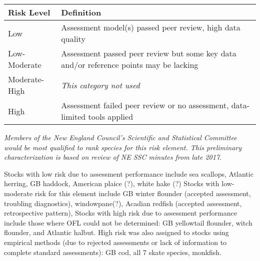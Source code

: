 \documentclass[11pt,]{article}
\begin{document}
\begin{longtable}[]{@{}ll@{}}
\toprule
\begin{minipage}[b]{0.22\columnwidth}\raggedright\strut
Risk Level\strut
\end{minipage} & \begin{minipage}[b]{0.72\columnwidth}\raggedright\strut
Definition\strut
\end{minipage}\tabularnewline
\midrule
\endhead
\begin{minipage}[t]{0.22\columnwidth}\raggedright\strut
Low\strut
\end{minipage} & \begin{minipage}[t]{0.72\columnwidth}\raggedright\strut
Assessment model(s) passed peer review, high data quality\strut
\end{minipage}\tabularnewline
\begin{minipage}[t]{0.22\columnwidth}\raggedright\strut
Low-Moderate\strut
\end{minipage} & \begin{minipage}[t]{0.72\columnwidth}\raggedright\strut
Assessment passed peer review but some key data and/or reference points
may be lacking\strut
\end{minipage}\tabularnewline
\begin{minipage}[t]{0.22\columnwidth}\raggedright\strut
Moderate-High\strut
\end{minipage} & \begin{minipage}[t]{0.72\columnwidth}\raggedright\strut
\emph{This category not used}\strut
\end{minipage}\tabularnewline
\begin{minipage}[t]{0.22\columnwidth}\raggedright\strut
High\strut
\end{minipage} & \begin{minipage}[t]{0.72\columnwidth}\raggedright\strut
Assessment failed peer review or no assessment, data-limited tools
applied\strut
\end{minipage}\tabularnewline
\bottomrule
\end{longtable}

\emph{Members of the New England Council's Scientific and Statistical
Committee would be most qualified to rank species for this risk element.
This preliminary characterization is based on review of NE SSC minutes
from late 2017.}

Stocks with low risk due to assessment performance include sea scallops,
Atlantic herring, GB haddock, American plaice (?), white hake (?) Stocks
with low-moderate risk for this element include GB winter flounder
(accepted assessment, troubling diagnostics), windowpane(?), Acadian
redfish (accepted assessment, retrospective pattern), Stocks with high
risk due to assessment performance include those where OFL could not be
determined: GB yellowtail flounder, witch flounder, and Atlantic halbut.
High risk was also assigned to stocks using empirical methods (due to
rejected assessments or lack of information to complete standard
assessments): GB cod, all 7 skate species, monkfish.
\end{document}
